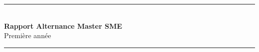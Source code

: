 \begin{titlepage}

  \newcommand{\HRule}{\rule{\linewidth}{0.5mm}} %
  
  \center %
   
  
  
  
  \HRule \\[0.4cm]
  { \huge \bfseries Rapport \textsc Alternance Master SME  }\\[0.4cm] %
  { \LARGE Première année}\\[0.4cm] %
  \HRule \\[1.5cm]
   

  
  

\end{titlepage}
